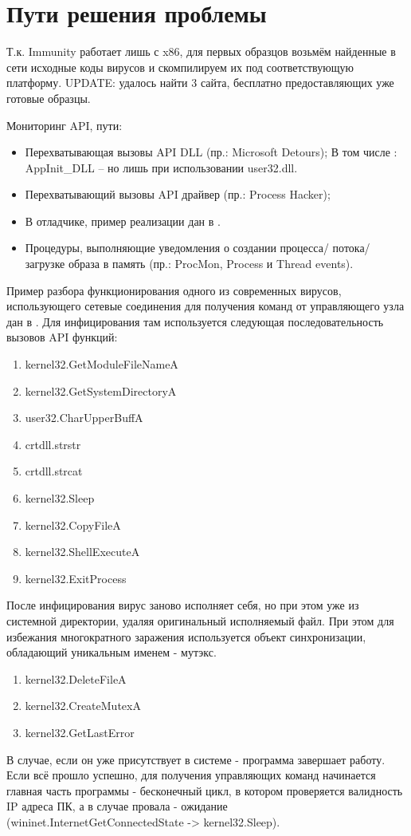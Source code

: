 \section {Пути решения проблемы}
Т.к. Immunity работает лишь с x86, для первых образцов возьмём найденные в сети
исходные коды вирусов и скомпилируем их под соответствующую платформу.
UPDATE: удалось найти 3 сайта, бесплатно предоставляющих уже готовые образцы.

Мониторинг API, пути:
\begin {itemize}
	\item Перехватывающая вызовы API DLL (пр.: Microsoft Detours);
	В том числе : AppInit\_DLL – но лишь при использовании user32.dll.
	\item Перехватывающий вызовы API драйвер (пр.: Process Hacker);
	\item В отладчике, пример реализации дан в \cite{MALWAREBOOK}.
	\item Процедуры, выполняющие уведомления о создании процесса/ потока/ загрузке образа в память (пр.:
 	ProcMon, Process и Thread events).
\end {itemize}
Пример разбора функционирования одного из современных вирусов, использующего сетевые соединения для
получения команд от управляющего узла дан в \cite{REVERSING}. Для инфицирования там используется следующая последовательность вызовов API функций:
\begin {enumerate}
	\item kernel32.GetModuleFileNameA
	\item kernel32.GetSystemDirectoryA
	\item user32.CharUpperBuffA
	\item crtdll.strstr
	\item crtdll.strcat
	\item kernel32.Sleep
	\item kernel32.CopyFileA
	\item kernel32.ShellExecuteA
	\item kernel32.ExitProcess
\end {enumerate}
После инфицирования вирус заново исполняет себя, но при этом уже из системной директории, удаляя оригинальный
исполняемый файл. При этом для избежания многократного заражения используется объект синхронизации, обладающий уникальным именем - мутэкс.
\begin {enumerate}
	\item kernel32.DeleteFileA
	\item kernel32.CreateMutexA
	\item kernel32.GetLastError
\end {enumerate}
В случае, если он уже присутствует в системе - программа завершает работу. Если всё прошло успешно, для получения управляющих команд начинается главная часть программы - бесконечный цикл, в котором проверяется валидность IP адреса
ПК, а в случае провала - ожидание (wininet.InternetGetConnectedState -> kernel32.Sleep).